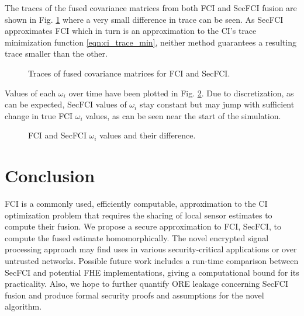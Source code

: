 \documentclass[letterpaper, 10 pt, conference]{ieeeconf}  %
\begin{document}
The traces of the fused covariance matrices from both FCI and SecFCI fusion are shown in Fig. \ref{fig:fci_secfci_trace} where a very small difference in trace can be seen. As SecFCI approximates FCI which in turn is an approximation to the CI's trace minimization function \eqref{eqn:ci_trace_min}, neither method guarantees a resulting trace smaller than the other.
\begin{figure}[tb]
   \vspace{-5pt}
   \begin{center}
      
   \end{center}
   \vspace{-10pt}
   \caption{Traces of fused covariance matrices for FCI and SecFCI.}
   \vspace{-\baselineskip}
   \label{fig:fci_secfci_trace}
\end{figure}
Values of each $\omega_i$ over time have been plotted in Fig. \ref{fig:fci_secfci_omegas}. Due to discretization, as can be expected, SecFCI values of $\omega_i$ stay constant but may jump with sufficient change in true FCI $\omega_i$ values, as can be seen near the start of the simulation.
\begin{figure}[tb]
   \vspace{-5pt}
   \begin{center}
      
   \end{center}
   \vspace{-10pt}
   \caption{FCI and SecFCI $\omega_i$ values and their difference.}
   \vspace{-\baselineskip}
   \label{fig:fci_secfci_omegas}
\end{figure}




\section{Conclusion} \label{sec:conclusion}
FCI is a commonly used, efficiently computable, approximation to the CI optimization problem that requires the sharing of local sensor estimates to compute their fusion. We propose a secure approximation to FCI, SecFCI, to compute the fused estimate homomorphically. The novel encrypted signal processing approach may find uses in various security-critical applications or over untrusted networks. Possible future work includes a run-time comparison between SecFCI and potential FHE implementations, giving a computational bound for its practicality. Also, we hope to further quantify ORE leakage concerning SecFCI fusion and produce formal security proofs and assumptions for the novel algorithm.



\end{document}
